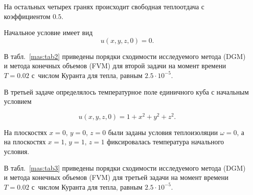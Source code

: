 На остальных четырех гранях происходит свободная теплоотдача с коэффициентом $0.5$. 

Начальное условие имеет вид $$u(x,y,z, 0)=0.$$ 





В табл.~\ref{mas:tab2} приведены порядки сходимости исследуемого метода (DGM) и метода конечных объемов (FVM) для второй задачи на момент времени ${T=0.02}$ с~числом Куранта для тепла, равным $2.5\cdot10^{-5}$.  


















В третьей задаче определялось температурное поле единичного куба с начальным условием 

$$u(x,y,z, 0)=1+x^2+y^2+z^2.$$ 

На плоскостях $x=0$, $y=0$, $z=0$ были заданы условия теплоизоляции $\omega=0$, а на плоскостях $x=1$, $y=1$, $z=1$ фиксировалась температура начального условия.



В табл.~\ref{mas:tab3}  приведены порядки сходимости исследуемого метода (DGM) и метода конечных объемов (FVM) для третьей задачи на момент времени ${T=0.02}$ с~числом Куранта для тепла, равным $2.5\cdot10^{-5}$. 




